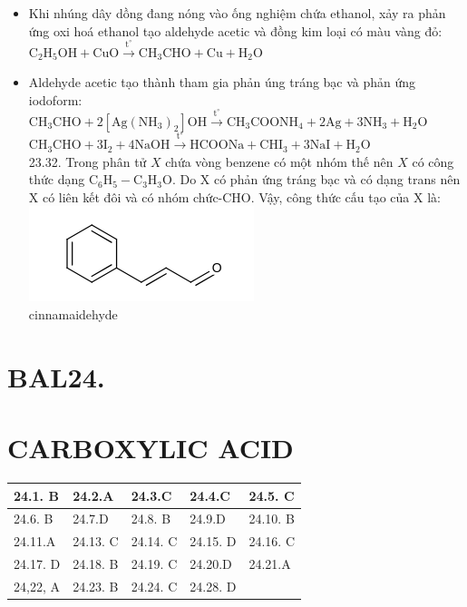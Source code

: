 \documentclass[10pt]{article}
\begin{document}
\begin{itemize}
  \item Khi nhúng dây dồng đang nóng vào ống nghiệm chứa ethanol, xảy ra phản ứng oxi hoá ethanol tạo aldehyde acetic và đồng kim loại có màu vàng đỏ:\\
$\mathrm{C}_{2} \mathrm{H}_{5} \mathrm{OH}+\mathrm{CuO} \xrightarrow{\mathrm{t}^{\circ}} \mathrm{CH}_{3} \mathrm{CHO}+\mathrm{Cu}+\mathrm{H}_{2} \mathrm{O}$
  \item Aldehyde acetic tạo thành tham gia phản úng tráng bạc và phản ứng iodoform:\\
$\mathrm{CH}_{3} \mathrm{CHO}+2\left[\mathrm{Ag}\left(\mathrm{NH}_{3}\right)_{2}\right] \mathrm{OH} \xrightarrow{\mathrm{t}^{\circ}} \mathrm{CH}_{3} \mathrm{COONH}_{4}+2 \mathrm{Ag}+3 \mathrm{NH}_{3}+\mathrm{H}_{2} \mathrm{O}$\\
$\mathrm{CH}_{3} \mathrm{CHO}+3 \mathrm{I}_{2}+4 \mathrm{NaOH} \xrightarrow{\mathrm{t}^{\circ}} \mathrm{HCOONa}+\mathrm{CHI}_{3}+3 \mathrm{NaI}+\mathrm{H}_{2} \mathrm{O}$\\
23.32. Trong phân tử $X$ chứa vòng benzene có một nhóm thế nên $X$ có công thức dạng $\mathrm{C}_{6} \mathrm{H}_{5}-\mathrm{C}_{3} \mathrm{H}_{3} \mathrm{O}$. Do X có phản ứng tráng bạc và có dạng trans nên X có liên kết đôi và có nhóm chức-CHO. Vậy, công thức cấu tạo của X là:\\
\includegraphics{smile-57a93f1bff637241367d59e4ee1181e23f6ae19b}\\
cinnamaidehyde
\end{itemize}

\section*{BAL24.}
\section*{CARBOXYLIC ACID}
\begin{center}
\begin{tabular}{|l|l|l|l|l|}
\hline
24.1. B & 24.2.A & 24.3.C & 24.4.C & 24.5. C \\
\hline
24.6. B & 24.7.D & 24.8. B & 24.9.D & 24.10. B \\
\hline
24.11.A & 24.13. C & 24.14. C & 24.15. D & 24.16. C \\
\hline
24.17. D & 24.18. B & 24.19. C & 24.20.D & 24.21.A \\
\hline
24,22, A & 24.23. B & 24.24. C & 24.28. D &  \\
\hline
\end{tabular}
\end{center}
\end{document}
